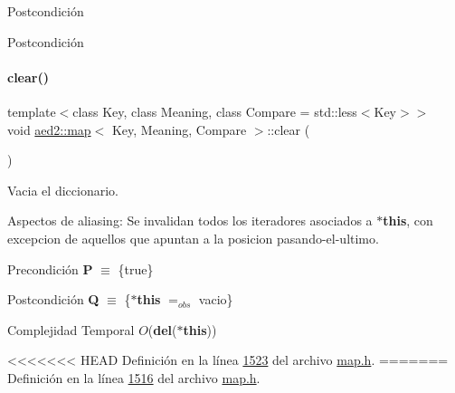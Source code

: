 \begin{DoxyPostcond}{\-Postcondición}
\begin{DoxyPostcond}{\-Postcondición}
\mbox{\label{classaed2_1_1map_a2bfa5165825979bf2431db55bc6bc9ca_a2bfa5165825979bf2431db55bc6bc9ca}} 
\paragraph{\texorpdfstring{clear()}{clear()}}
{\footnotesize\ttfamily template$<$class Key, class Meaning, class Compare = std\+::less$<$\+Key$>$$>$ \\
void \hyperlink{classaed2_1_1map}{aed2\+::map}$<$ Key, Meaning, Compare $>$\+::clear (\begin{DoxyParamCaption}{ }\end{DoxyParamCaption})\hspace{0.3cm}{\ttfamily [inline]}}



Vacia el diccionario. 

\begin{DoxyParagraph}{Aspectos de aliasing\+:}
Se invalidan todos los iteradores asociados a {\bfseries $\ast$this}, con excepcion de aquellos que apuntan a la posicion pasando-\/el-\/ultimo.
\end{DoxyParagraph}
\begin{DoxyPrecond}{Precondición}
{\bfseries P} $\equiv$ \{true\} 
\end{DoxyPrecond}
\begin{DoxyPostcond}{Postcondición}
{\bfseries Q} $\equiv$ \{{\bfseries $\ast$this} $=_{obs}$ vacio\}
\end{DoxyPostcond}

\begin{DoxyDescription}
\item[Complejidad Temporal]$O$({\bfseries del}({\bfseries $\ast$this}))
\end{DoxyDescription}

<<<<<<< HEAD
\-Definición en la línea \hyperlink{map_8h_source_l01523}{1523} del archivo \hyperlink{map_8h_source}{map.\-h}.
=======
Definición en la línea \hyperlink{map_8h_source_l01516}{1516} del archivo \hyperlink{map_8h_source}{map.\+h}.

\mbox{\label{classaed2_1_1map_a43ddb71cc91e5c6021a7a1f243d6cc4a_a43ddb71cc91e5c6021a7a1f243d6cc4a}} 

\end{DoxyPostcond}
\end{DoxyPostcond}
